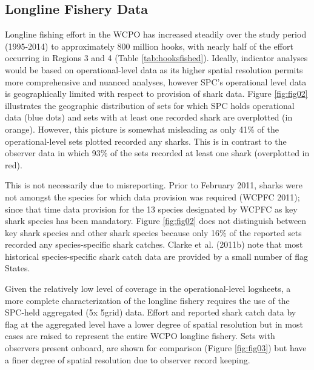 \documentclass[12pt]{SCreport}
\begin{document}

\subsection{Longline Fishery Data}
  
Longline fishing effort in the WCPO has increased steadily over the study period (1995-2014) to approximately 800 million hooks, with nearly half of the effort occurring in Regions 3 and 4 (Table \ref{tab:hooksfished}).  Ideally, indicator analyses would be based on operational-level data as its higher spatial resolution permits more comprehensive and nuanced analyses, however SPC's operational level data is geographically limited with respect to provision of shark data.  Figure \ref{fig:fig02} illustrates the geographic distribution of sets for which SPC holds operational data (blue dots) and sets with at least one recorded shark are overplotted (in orange). However, this picture is somewhat misleading as only 41\% of the operational-level sets plotted recorded any sharks. This is in contrast to the observer data in which 93\% of the sets recorded at least one shark (overplotted in red).

This is not necessarily due to misreporting. Prior to February 2011, sharks were not amongst the species for which data provision was required (WCPFC 2011); since that time data provision for the 13 species designated by WCPFC as key shark species has been mandatory. Figure \ref{fig:fig02} does not distinguish between key shark species and other shark species because only 16\% of the reported sets recorded any species-specific shark catches. Clarke et al. (2011b) note that most historical species-specific shark catch data are provided by a small number of flag States.

Given the relatively low level of coverage in the operational-level logsheets, a more complete characterization of the longline fishery requires the use of the SPC-held aggregated (5\degree x 5\degree grid) data. Effort and reported shark catch data by flag at the aggregated level have a lower degree of spatial resolution but in most cases are raised to represent the entire WCPO longline fishery. Sets with observers present onboard, are shown for comparison (Figure \ref{fig:fig03}) but have a finer degree of spatial resolution due to observer record keeping. 
\end{document}
